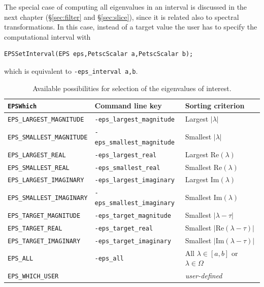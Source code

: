 The special case of computing all eigenvalues in an interval is discussed in the next chapter (\S\ref{sec:filter} and \S\ref{sec:slice}), since it is related also to spectral transformations. In this case, instead of a target value the user has to specify the computational interval with
        \begin{Verbatim}[fontsize=\small]
        EPSSetInterval(EPS eps,PetscScalar a,PetscScalar b);
        \end{Verbatim}
which is equivalent to \Verb!-eps_interval a,b!.

\begin{table}
\centering
{\small \begin{tabular}{lll}
\texttt{EPSWhich}                  & Command line key                   & Sorting criterion \\\hline
\texttt{EPS\_LARGEST\_MAGNITUDE}   & \texttt{-eps\_largest\_magnitude}  & Largest $|\lambda|$ \\
\texttt{EPS\_SMALLEST\_MAGNITUDE}  & \texttt{-eps\_smallest\_magnitude} & Smallest $|\lambda|$ \\
\texttt{EPS\_LARGEST\_REAL}        & \texttt{-eps\_largest\_real}       & Largest $\mathrm{Re}(\lambda)$ \\
\texttt{EPS\_SMALLEST\_REAL}       & \texttt{-eps\_smallest\_real}      & Smallest $\mathrm{Re}(\lambda)$ \\
\texttt{EPS\_LARGEST\_IMAGINARY}   & \texttt{-eps\_largest\_imaginary}  & Largest $\mathrm{Im}(\lambda)$\footnotemark[1] \\
\texttt{EPS\_SMALLEST\_IMAGINARY}  & \texttt{-eps\_smallest\_imaginary} & Smallest $\mathrm{Im}(\lambda)$\footnotemark[1] \\
\hline
\texttt{EPS\_TARGET\_MAGNITUDE}    & \texttt{-eps\_target\_magnitude}   & Smallest $|\lambda-\tau|$ \\
\texttt{EPS\_TARGET\_REAL}         & \texttt{-eps\_target\_real}        & Smallest $|\mathrm{Re}(\lambda-\tau)|$ \\
\texttt{EPS\_TARGET\_IMAGINARY}    & \texttt{-eps\_target\_imaginary}   & Smallest $|\mathrm{Im}(\lambda-\tau)|$ \\
\hline
\texttt{EPS\_ALL}                  & \texttt{-eps\_all}                 & All $\lambda\in[a,b]$ or $\lambda\in\Omega$\\
\texttt{EPS\_WHICH\_USER}          &                                    & \emph{user-defined} \\\hline
\end{tabular} }
\caption{\label{tab:portion}Available possibilities for selection of the eigenvalues of interest.}
\end{table}

